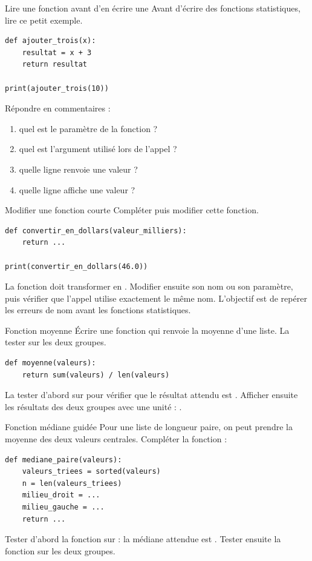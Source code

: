 \documentclass[11pt,a4paper]{article}
\begin{document}
\begin{mandatoryexercise}{Lire une fonction avant d'en écrire une}
Avant d'écrire des fonctions statistiques, lire ce petit exemple.
\begin{lstlisting}
def ajouter_trois(x):
    resultat = x + 3
    return resultat

print(ajouter_trois(10))
\end{lstlisting}
Répondre en commentaires :
\begin{enumerate}
  \item quel est le paramètre de la fonction ?
  \item quel est l'argument utilisé lors de l'appel ?
  \item quelle ligne renvoie une valeur ?
  \item quelle ligne affiche une valeur ?
\end{enumerate}
\end{mandatoryexercise}

\begin{mandatoryexercise}{Modifier une fonction courte}
Compléter puis modifier cette fonction.
\begin{lstlisting}
def convertir_en_dollars(valeur_milliers):
    return ...

print(convertir_en_dollars(46.0))
\end{lstlisting}
La fonction doit transformer  en . Modifier ensuite son nom ou son paramètre, puis vérifier que l'appel utilise exactement le même nom. L'objectif est de repérer les erreurs de nom avant les fonctions statistiques.
\end{mandatoryexercise}

\begin{mandatoryexercise}{Fonction moyenne}
Écrire une fonction  qui renvoie la moyenne d'une liste. La tester sur les deux groupes.
\begin{lstlisting}
def moyenne(valeurs):
    return sum(valeurs) / len(valeurs)
\end{lstlisting}
La tester d'abord sur \code{[10, 12, 14]} pour vérifier que le résultat attendu est . Afficher ensuite les résultats des deux groupes avec une unité : .
\end{mandatoryexercise}

\begin{mandatoryexercise}{Fonction médiane guidée}
Pour une liste de longueur paire, on peut prendre la moyenne des deux valeurs centrales. Compléter la fonction :
\begin{lstlisting}
def mediane_paire(valeurs):
    valeurs_triees = sorted(valeurs)
    n = len(valeurs_triees)
    milieu_droit = ...
    milieu_gauche = ...
    return ...
\end{lstlisting}
Tester d'abord la fonction sur \code{[8, 10, 12, 14]} : la médiane attendue est . Tester ensuite la fonction sur les deux groupes.
\end{mandatoryexercise}
\end{document}
